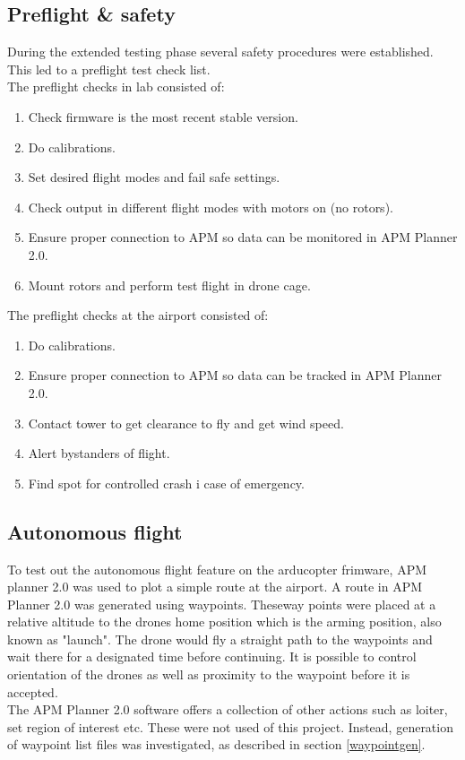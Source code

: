 \subsection{Preflight \& safety}
During the extended testing phase several safety procedures were established. This led to a
preflight test check list.\\
The preflight checks in lab consisted of:
\begin{enumerate}
\item Check firmware is the most recent stable version.
\item Do calibrations.
\item Set desired flight modes and fail safe settings.
\item Check output in different flight modes with motors on (no rotors).
\item Ensure proper connection to APM so data can be monitored in APM Planner 2.0.
\item Mount rotors and perform test flight in drone cage.
\end{enumerate}

The preflight checks at the airport consisted of:
\begin{enumerate}
\item Do calibrations.
\item Ensure proper connection to APM so data can be tracked in APM Planner 2.0.
\item Contact tower to get clearance to fly and get wind speed.
\item Alert bystanders of flight.
\item Find spot for controlled crash i case of emergency.
\end{enumerate}

\subsection{Autonomous flight}
To test out the autonomous flight feature on the arducopter frimware, APM planner 2.0 was used to
plot a simple route at the airport. A route in APM Planner 2.0 was generated using waypoints.
Theseway points were placed at a relative altitude to the drones home position which is the arming
position, also known as "launch".
The drone would fly a straight path to the waypoints and wait there for a designated
time before continuing.
It is possible to control orientation of the drones as well as proximity to the waypoint
before it is accepted.\\
The APM Planner 2.0 software offers a collection of other actions such as loiter, set region of
interest etc. These were not used of this project.
Instead, generation of waypoint list files was investigated, as described in section \ref{waypointgen}.

